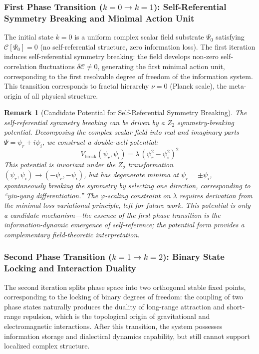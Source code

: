 \documentclass[12pt,a4paper,twocolumn]{article}
\renewcommand{\phi}{\varphi}
\newtheorem{remark}[theorem]{Remark}
\begin{document}
\subsubsection{First Phase Transition ($k=0\to k=1$): Self-Referential Symmetry Breaking and Minimal Action Unit}
The initial state $k=0$ is a uniform complex scalar field substrate $\Psi_0$ satisfying $\mathcal{C}[\Psi_0]=0$ (no self-referential structure, zero information loss). The first iteration induces self-referential symmetry breaking: the field develops non-zero self-correlation fluctuations $\delta\mathcal{C}\neq0$, generating the first minimal action unit, corresponding to the first resolvable degree of freedom of the information system. This transition corresponds to fractal hierarchy $\nu=0$ (Planck scale), the meta-origin of all physical structure.

\begin{remark}[Candidate Potential for Self-Referential Symmetry Breaking]
\label{rmk:z2_breaking}
The self-referential symmetry breaking can be driven by a $Z_2$ symmetry-breaking potential. Decomposing the complex scalar field into real and imaginary parts $\Psi = \psi_r + i\psi_i$, we construct a double-well potential:
\begin{equation}
V_{\text{break}}(\psi_r, \psi_i) = \lambda\,(\psi_r^2 - \psi_i^2)^2
\end{equation}
This potential is invariant under the $Z_2$ transformation $(\psi_r, \psi_i) \to (-\psi_r, -\psi_i)$, but has degenerate minima at $\psi_r = \pm\psi_i$, spontaneously breaking the symmetry by selecting one direction, corresponding to ``yin-yang differentiation.'' The $\phi$-scaling constraint on $\lambda$ requires derivation from the minimal loss variational principle, left for future work. This potential is only a candidate mechanism---the essence of the first phase transition is the information-dynamic emergence of self-reference; the potential form provides a complementary field-theoretic interpretation.
\end{remark}

\subsubsection{Second Phase Transition ($k=1\to k=2$): Binary State Locking and Interaction Duality}
The second iteration splits phase space into two orthogonal stable fixed points, corresponding to the locking of binary degrees of freedom: the coupling of two phase states naturally produces the duality of long-range attraction and short-range repulsion, which is the topological origin of gravitational and electromagnetic interactions. After this transition, the system possesses information storage and dialectical dynamics capability, but still cannot support localized complex structure.
\end{document}
